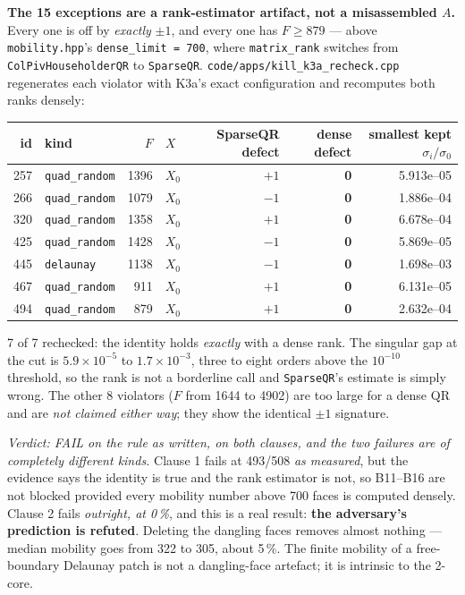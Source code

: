 \documentclass[10pt,a4paper]{article}
\newcommand{\fn}[1]{\nolinkurl{#1}}
\begin{document}
\textbf{The 15 exceptions are a rank-estimator artifact, not a misassembled $A$.} Every one is
off by \emph{exactly} $\pm1$, and every one has $F\ge879$ --- above \fn{mobility.hpp}'s
\fn{dense_limit = 700}, where \texttt{matrix\_rank} switches from
\texttt{ColPivHouseholderQR} to \texttt{SparseQR}. \fn{code/apps/kill_k3a_recheck.cpp}
regenerates each violator with K3a's exact configuration and recomputes both ranks densely:

\begin{center}\small
\begin{tabular}{@{}rlrlrrr@{}}
\toprule
id & kind & $F$ & $X$ & SparseQR defect & dense defect & smallest kept $\sigma_i/\sigma_0$ \\
\midrule
257 & \fn{quad_random} & 1396 & $X_0$ & $+1$ & \textbf{0} & 5.913e--05 \\
266 & \fn{quad_random} & 1079 & $X_0$ & $-1$ & \textbf{0} & 1.886e--04 \\
320 & \fn{quad_random} & 1358 & $X_0$ & $+1$ & \textbf{0} & 6.678e--04 \\
425 & \fn{quad_random} & 1428 & $X_0$ & $-1$ & \textbf{0} & 5.869e--05 \\
445 & \fn{delaunay}    & 1138 & $X_0$ & $-1$ & \textbf{0} & 1.698e--03 \\
467 & \fn{quad_random} & 911  & $X_0$ & $+1$ & \textbf{0} & 6.131e--05 \\
494 & \fn{quad_random} & 879  & $X_0$ & $+1$ & \textbf{0} & 2.632e--04 \\
\bottomrule
\end{tabular}
\end{center}

7 of 7 rechecked: the identity holds \emph{exactly} with a dense rank. The singular gap at the
cut is $5.9\times10^{-5}$ to $1.7\times10^{-3}$, three to eight orders above the $10^{-10}$
threshold, so the rank is not a borderline call and \texttt{SparseQR}'s estimate is simply
wrong. The other 8 violators ($F$ from 1644 to 4902) are too large for a dense QR and are
\emph{not claimed either way}; they show the identical $\pm1$ signature.

\emph{Verdict: FAIL on the rule as written, on both clauses, and the two failures are of
completely different kinds.} Clause 1 fails at 493/508 \emph{as measured}, but the evidence says
the identity is true and the rank estimator is not, so B11--B16 are not blocked provided every
mobility number above 700 faces is computed densely. Clause 2 fails \emph{outright, at 0\,\%},
and this is a real result: \textbf{the adversary's prediction is refuted}. Deleting the dangling
faces removes almost nothing --- median mobility goes from 322 to 305, about 5\,\%. The finite
mobility of a free-boundary Delaunay patch is not a dangling-face artefact; it is intrinsic to
the 2-core.
\end{document}

